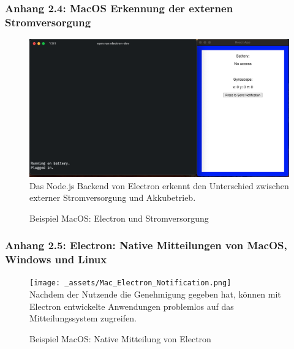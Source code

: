 \documentclass[a4paper]{scrartcl}
\begin{document}
\newpage

\subsubsection*{Anhang 2.4: MacOS Erkennung der externen Stromversorgung}

\begin{figure}[H]
	\centering
	\caption{Beispiel MacOS: Electron und Stromversorgung}
	\includegraphics[scale=0.3]{_assets/Mac_Electron_Energy.png} \\
	Das Node.js Backend von Electron erkennt den Unterschied zwischen externer Stromversorgung und Akkubetrieb.
\end{figure}

\newpage

\subsubsection*{Anhang 2.5: Electron: Native Mitteilungen von MacOS, Windows und Linux}

\begin{figure}[H]
	\centering
	\caption{Beispiel MacOS: Native Mitteilung von Electron}
	\texttt{[image: \_assets/Mac\_Electron\_Notification.png]} \\
	Nachdem der Nutzende die Genehmigung gegeben hat, können mit Electron entwickelte Anwendungen problemlos auf das Mitteilungssystem zugreifen.
\end{figure}
\end{document}
